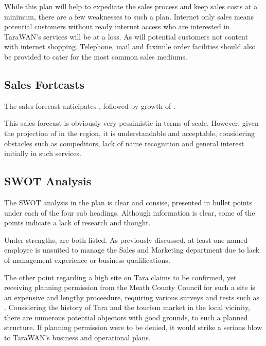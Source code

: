 \documentclass[a4paper,12pt]{article}
\begin{document}
While this plan will help to expediate the sales process and keep sales
costs at a minimum, there are a few weaknesses to such a plan. Internet
only sales means potential customers without ready internet access who
are interested in TaraWAN's services will be at a loss. As will
potential customers not content with internet shopping. Telephone, mail
and faximile order facilities should also be provided to cater for the
most common sales mediums.

\subsection{Sales Fortcasts}

The sales forecast anticipates \cite[5 customers in the first 2
months]{busplan}, followed by growth of \cite[10 additional customers
every two mmonths there-after]{busplan}.


This sales forecast is obviously very pessimistic in terms of scale.
However, given the projection of 
\cite[8000 potential customers]{busplan} in the region, it is
understandable and acceptable, considering obstacles such as
compeditors, lack of name recognition and general interest initially in
such services.

\subsection{SWOT Analysis}

The SWOT analysis in the plan is clear and consise, presented in bullet
points under each of the four sub headings. Although information is
clear, some of the points indicate a lack of research and thought.


Under strengths, \cite[knowledgeable staff and confirmed high site at
Tara]{busplan} are both listed. As previously discussed, at least one
named employee is unsuited to manage the Sales and Marketing department
due to lack of management experience or business qualifications.


The other point regarding a high site on Tara claims to be confirmed,
yet receiving planning permission from the Meath County Council for such
a site is an expensive and lengthy proceedure, requiring various surveys
and tests such as \cite[enviromental site surveys]{meathcoco}.
Considering the history of Tara and the tourism market in the local
vicinity, there are numerous potential objectors with good grounds, to 
such a planned structure. If planning permission were to be denied, it 
would strike a serious blow to TaraWAN's business and operational plans. 
\end{document}
